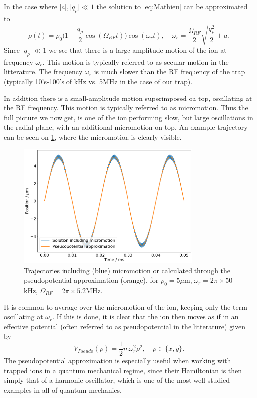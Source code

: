 In the case where $\vert a\vert,\vert q_\rho\vert\ll 1$ the solution to \cref{eq:Mathieu} can be approximated to
\begin{equation}
    \label{eq:omega_r}
    \rho(t) = \rho_0\bigg(1-\frac{q_\rho}{2}\cos{(\Omega_{RF}t)}\bigg)\cos{(\omega_r t)},\quad \omega_r = \frac{\Omega_{RF}}{2}\sqrt{\frac{q_\rho^2}{2}+a}.
\end{equation}
Since $\vert q_\rho\vert\ll 1$ we see that there is a large-amplitude motion of the ion at frequency $\omega_r$. This motion is typically referred to as secular motion in the litterature. The frequency $\omega_r$ is much slower than the RF frequency of the trap (typically 10's-100's of kHz vs. 5MHz in the case of our trap). 

In addition there is a small-amplitude motion superimposed on top, oscillating at the RF frequency. This motion is typically referred to as micromotion. Thus the full picture we now get, is one of the ion performing slow, but large oscillations in the radial plane, with an additional micromotion on top. An example trajectory can be seen on \cref{fig:micromotion}, where the micromotion is clearly visible.



\begin{figure}
    \includegraphics[width = 0.8\textwidth]{main/Micromotion.png}
    \caption{Trajectories including (blue) micromotion or calculated through the pseudopotential approximation (orange), for $\rho_0 = 5 {\mu}$m, $\omega_r = 2\pi\times 50$kHz, $\Omega_{RF} = 2\pi\times 5.2$MHz.}
    \label{fig:micromotion}
\end{figure}

It is common to average over the micromotion of the ion, keeping only the term oscillating at $\omega_r$. If this is done, it is clear that the ion then moves as if in an effective potential (often referred to as pseudopotential in the litterature) given by
\begin{equation}
    V_{Pseudo}(\rho) = \frac{1}{2}m\omega_r^2\rho^2,\quad \rho\in\{x,y\}.
\end{equation}
The pseudopotential approximation is especially useful when working with trapped ions in a quantum mechanical regime, since their Hamiltonian is then simply that of a harmonic oscillator, which is one of the most well-studied examples in all of quantum mechanics.
